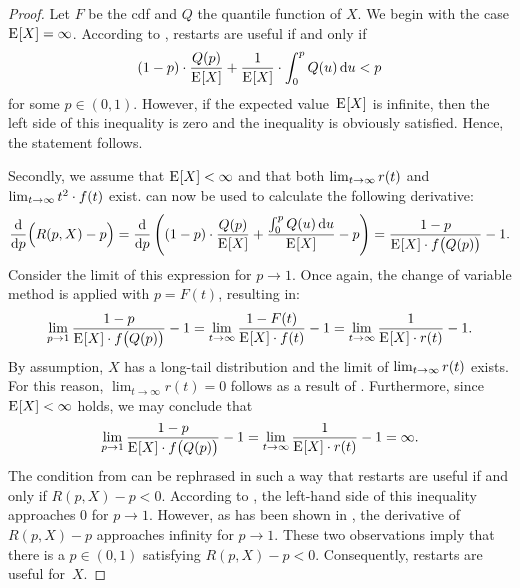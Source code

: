 \begin{proof}
	Let $F$ be the cdf and $Q$ the quantile function of $X$.
	We begin with the case 
	$\expectation{X} = \infty$.
	According to , restarts are useful if and only if
		\[
		(1-p)\cdot \frac{Q(p)}{\expectation{X}} + \frac{1}{\expectation{X}} \cdot \integralLow[u]{0}{p}{Q(u)} < p
		\]
	for some $p \in (0,1)$. However, if the expected value~$\expectation{X}$ is infinite, then the left side of this inequality is zero and the inequality is obviously satisfied. Hence, the statement follows.
	
	Secondly, we assume that $\expectation{X} < \infty$ and that
	both
	\mbox{$\Lim{t}r(t)$} and \mbox{$\Lim{t} t^2 \cdot f(t)$} exist.  can now be used to calculate the following derivative:
	\begin{align*}
		\frac{\D}{\D p} \Big( R(p,X) - p \Big)
		= \frac{\D}{\D p} \left((1-p)\cdot \frac{Q(p)}{\expectation{X}}+\frac{\integralLow[u]{0}{p}{Q(u)}}{\expectation{X}}-p\right)
		= \frac{1-p}{\expectation{X}\cdot f\bigl(Q(p)\bigr)}-1.
	\end{align*}
	Consider the limit of this expression for $p\rightarrow 1$. Once again, the change of variable method is applied with $p=F(t)$, resulting in:
	\begin{align*}
		\lim\limits_{p\rightarrow 1} \frac{1-p}{\expectation{X}\cdot f\bigl(Q(p)\bigr)}-1 
		= \lim\limits_{t\rightarrow \infty} \frac{1-F(t)}{\expectation{X}\cdot f(t)}-1 
		= \lim\limits_{t\rightarrow \infty} \frac{1}{\expectation{X}\cdot r(t)}-1.
	\end{align*}
	By assumption, $X$ has a long-tail distribution and the limit of \mbox{$\Lim{t}r(t)$} exists. For this reason, \mbox{$\lim_{t\rightarrow \infty}r(t)=0$} follows as a result of . Furthermore, since $\expectation{X} < \infty$ holds, we may conclude that  	
	\begin{align}
		\label{eq:long_tail_exp_infinity}
		\lim\limits_{p\rightarrow 1} \frac{1-p}{\expectation{X}\cdot f\bigl(Q(p)\bigr)}-1 
		= \lim\limits_{t\rightarrow \infty} \frac{1}{\expectation{X}\cdot r(t)}-1 = \infty.
	\end{align}
	The condition from  can be rephrased in such a way that restarts are useful if and only if 
	$R(p,X) - p < 0$.
	According to , the left-hand side of this inequality approaches $0$ for $p\rightarrow 1$.
	However, as has been shown in , the derivative of 
	$R(p,X)-p$
	approaches infinity for $p\rightarrow 1$. These two observations imply that there is a $p\in (0,1)$ satisfying 
	$R(p,X) - p < 0$.
	Consequently, restarts are useful for~$X$.
\end{proof}

